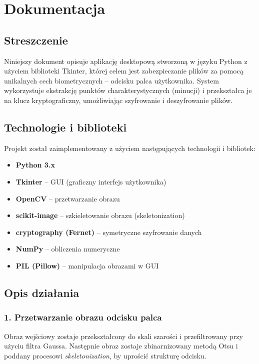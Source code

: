 \documentclass{urdpl}     %
\author{Oleksii Nawrocki, Tomasz Nowak}
\date{2025}
\begin{document}
\titlepages

\chapter{Dokumentacja}

\section*{Streszczenie}
Niniejszy dokument opisuje aplikację desktopową stworzoną w języku Python z użyciem biblioteki Tkinter, której celem jest zabezpieczanie plików za pomocą unikalnych cech biometrycznych – odcisku palca użytkownika. System wykorzystuje ekstrakcję punktów charakterystycznych (minucji) i przekształca je na klucz kryptograficzny, umożliwiając szyfrowanie i deszyfrowanie plików.

\section{Technologie i biblioteki}
Projekt został zaimplementowany z użyciem następujących technologii i bibliotek:
\begin{itemize}
	\item \textbf{Python 3.x}
	\item \textbf{Tkinter} – GUI (graficzny interfejs użytkownika)
	\item \textbf{OpenCV} – przetwarzanie obrazu
	\item \textbf{scikit-image} – szkieletowanie obrazu (skeletonization)
	\item \textbf{cryptography (Fernet)} – symetryczne szyfrowanie danych
	\item \textbf{NumPy} – obliczenia numeryczne
	\item \textbf{PIL (Pillow)} – manipulacja obrazami w GUI
\end{itemize}

\section{Opis działania}

\subsection{1. Przetwarzanie obrazu odcisku palca}
Obraz wejściowy zostaje przekształcony do skali szarości i przefiltrowany przy użyciu filtra Gaussa. Następnie obraz zostaje zbinarnizowany metodą Otsu i poddany procesowi \textit{skeletonization}, by uprościć strukturę odcisku.
\end{document}
